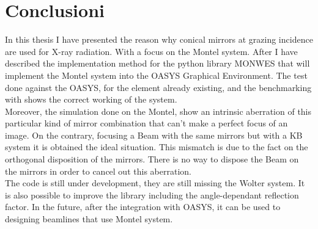 %
%
\cleardoublepage
%
%
%
\chapter*{Conclusioni}
%
%
\label{cap:conclusioni}
%
%
In this thesis I have presented the reason why conical mirrors at grazing incidence are used for X-ray radiation. With a focus on the Montel system. After I have described the implementation method for the python library MONWES that will implement the Montel system into the OASYS Graphical Environment.
The test done against the OASYS, for the element already existing, and the benchmarking with \cite{resta2015nested} shows the correct working of the system. 
\\
Moreover, the simulation done on the Montel, show an intrinsic aberration of this particular kind of mirror combination that can't make a perfect focus of an image. On the contrary, focusing a Beam with the same mirrors but with a KB system it is obtained the ideal situation. This mismatch is due to the fact on the orthogonal disposition of the mirrors. There is no way to dispose the Beam on the mirrors in order to cancel out this aberration.
\\
The code is still under development, they are still missing the Wolter system. It is also possible to improve the library including the angle-dependant reflection factor. In the future, after the integration with OASYS, it can be used to designing beamlines that use Montel system.
%
